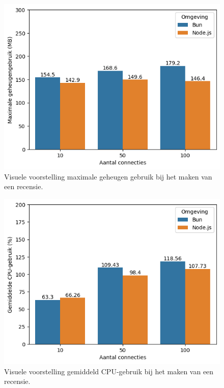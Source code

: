   \begin{figure}[H]
    \centering
    \includegraphics[width=0.7\columnwidth]{graphics/PostPostgresRAM.png}
    \caption{\label{fig:postgeheugenpostgres}Visuele voorstelling maximale geheugen gebruik bij het maken van een recensie.}
  \end{figure}
  \begin{figure}[H]
    \centering
    \includegraphics[width=0.7\columnwidth]{graphics/PostMySqlCpu.png}
    \caption{\label{fig:postcpupostgres}Visuele voorstelling gemiddeld CPU-gebruik bij het maken van een recensie.}
  \end{figure}

